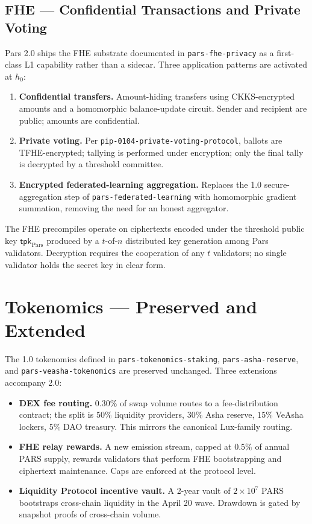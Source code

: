 \documentclass[11pt,a4paper]{article}
\begin{document}
\subsection{FHE --- Confidential Transactions and Private Voting}

Pars 2.0 ships the FHE substrate documented in \texttt{pars-fhe-privacy}
as a first-class L1 capability rather than a sidecar. Three application
patterns are activated at $h_0$:

\begin{enumerate}[leftmargin=*]
\item \textbf{Confidential transfers.} Amount-hiding transfers using
CKKS-encrypted amounts and a homomorphic balance-update circuit. Sender
and recipient are public; amounts are confidential.
\item \textbf{Private voting.} Per \texttt{pip-0104-private-voting-protocol},
ballots are TFHE-encrypted; tallying is performed under encryption; only
the final tally is decrypted by a threshold committee.
\item \textbf{Encrypted federated-learning aggregation.} Replaces the
1.0 secure-aggregation step of \texttt{pars-federated-learning} with
homomorphic gradient summation, removing the need for an honest
aggregator.
\end{enumerate}

The FHE precompiles operate on ciphertexts encoded under the threshold
public key $\mathsf{tpk}_{\text{Pars}}$ produced by a $t$-of-$n$
distributed key generation among Pars validators. Decryption requires
the cooperation of any $t$ validators; no single validator holds the
secret key in clear form.

\section{Tokenomics --- Preserved and Extended}
\label{sec:tokenomics}

The 1.0 tokenomics defined in \texttt{pars-tokenomics-staking},
\texttt{pars-asha-reserve}, and \texttt{pars-veasha-tokenomics} are
preserved unchanged. Three extensions accompany 2.0:

\begin{itemize}[leftmargin=*]
\item \textbf{DEX fee routing.} $0.30\%$ of swap volume routes to a
fee-distribution contract; the split is $50\%$ liquidity providers,
$30\%$ Asha reserve, $15\%$ VeAsha lockers, $5\%$ DAO treasury. This
mirrors the canonical Lux-family routing.
\item \textbf{FHE relay rewards.} A new emission stream, capped at $0.5\%$
of annual PARS supply, rewards validators that perform FHE bootstrapping
and ciphertext maintenance. Caps are enforced at the protocol level.
\item \textbf{Liquidity Protocol incentive vault.} A 2-year vault of
$2 \times 10^7$ PARS bootstraps cross-chain liquidity in the April 20
wave. Drawdown is gated by snapshot proofs of cross-chain volume.
\end{itemize}
\end{document}
